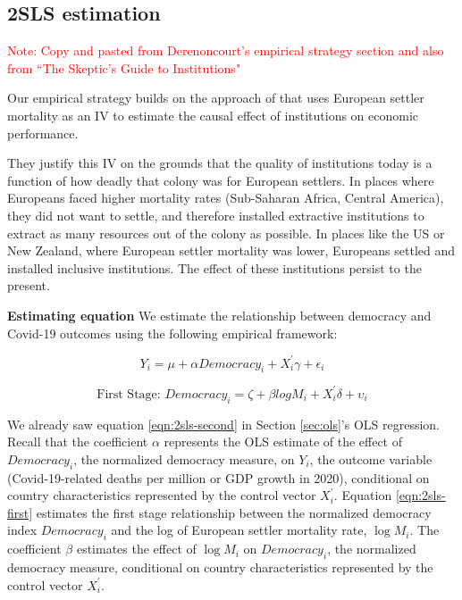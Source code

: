 
\subsection{2SLS estimation} \label{sec:2sls-main}

\textcolor{red}{Note: Copy and pasted from Derenoncourt's empirical strategy section and also from ``The Skeptic's Guide to Institutions"}

Our empirical strategy builds on the approach of \citet{ajr} that uses European settler mortality as an IV to estimate the causal effect of institutions on economic performance. 

They justify this IV on the grounds that the quality of institutions today is a function of how deadly that colony was for European settlers. In places where Europeans faced higher mortality rates (Sub-Saharan Africa, Central America), they did not want to settle, and therefore installed extractive institutions to extract as many resources out of the colony as possible. In places like the US or New Zealand, where European settler mortality was lower, Europeans settled and installed inclusive institutions. The effect of these institutions persist to the present. 


\noindent \textbf{Estimating equation} We estimate the relationship between democracy and Covid-19 outcomes using the following empirical framework: 

\begin{equation}\tag{1}
    \label{eqn:2sls-second}
    Y_i = \mu + \alpha Democracy_i + X^{'}_i \gamma + \epsilon_i
\end{equation}

\begin{equation}
    \label{eqn:2sls-first}
    \text{First Stage: } 
    Democracy_i = \zeta + \beta log M_i + X^{'}_i \delta + \upsilon_i
\end{equation}

\noindent We already saw equation \ref{eqn:2sls-second} in Section \ref{sec:ols}'s OLS regression. Recall that the coefficient $\alpha$ represents the OLS estimate of the effect of $Democracy_i$, the normalized democracy measure, on $Y_i$, the outcome variable (Covid-19-related deaths per million or GDP growth in 2020), conditional on country characteristics represented by the control vector $X^{'}_i$. Equation \ref{eqn:2sls-first} estimates the first stage relationship between the normalized democracy index $Democracy_i$ and the log of European settler mortality rate, $\log{M_i}$. The coefficient $\beta$ estimates the effect of $\log{M_i}$ on $Democracy_i$, the normalized democracy measure, conditional on country characteristics represented by the control vector $X^{'}_i$. 

